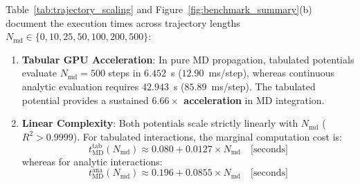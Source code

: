 \documentclass[11pt,a4paper]{article}
\begin{document}
Table~\ref{tab:trajectory_scaling} and Figure~\ref{fig:benchmark_summary}(b) document the execution times across trajectory lengths
$N_{\mathrm{md}} \in \{0, 10, 25, 50, 100, 200, 500\}$:
\begin{enumerate}
    \item \textbf{Tabular GPU Acceleration}: In pure MD propagation, tabulated potentials evaluate $N_{\mathrm{md}} = 500$ steps in $\mathbf{6.452}$~s ($12.90$~ms/step), whereas continuous analytic evaluation requires $\mathbf{42.943}$~s ($85.89$~ms/step). The tabulated potential provides a sustained \textbf{$6.66\times$ acceleration} in MD integration.
    \item \textbf{Linear Complexity}: Both potentials scale strictly linearly with $N_{\mathrm{md}}$ ($R^2 > 0.9999$). For tabulated interactions, the marginal computation cost is:
    \begin{equation}
    t_{\mathrm{MD}}^{\mathrm{tab}}(N_{\mathrm{md}}) \approx 0.080 + 0.0127 \times N_{\mathrm{md}} \quad \text{[seconds]}
    \end{equation}
    whereas for analytic interactions:
    \begin{equation}
    t_{\mathrm{MD}}^{\mathrm{ana}}(N_{\mathrm{md}}) \approx 0.196 + 0.0855 \times N_{\mathrm{md}} \quad \text{[seconds]}
    \end{equation}
\end{enumerate}
\end{document}
